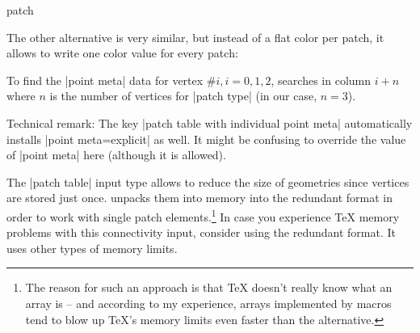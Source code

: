 {\begin{plottype}[/pgfplots]{patch}
\begin{pgfplotskeylist}
        The other alternative  is very similar, but instead of a flat color per patch, it allows
        to write one color value for every patch:
\begin{codeexample}[]
\end{codeexample}
        \noindent To find the |point meta| data for vertex $\#i, i=0,1,2$,
        \PGFPlots{} searches in column $i+n$ where $n$ is the number of
        vertices for |patch type| (in our case, $n=3$).

        Technical remark: The key |patch table with individual point meta|
        automatically installs |point meta=explicit| as well. It might be
        confusing to override the value of |point meta| here (although it is
        allowed).

        The |patch table| input type allows to reduce the size of geometries
        since vertices are stored just once. \PGFPlots{} unpacks them into
        memory into the redundant format in order to work with single patch
        elements.\footnote{The reason for such an approach is that \TeX{}
        doesn't really know what an array is -- and according to my experience,
        arrays implemented by macros tend to blow up \TeX's memory limits even
        faster than the alternative.} In case you experience \TeX{} memory
        problems with this connectivity input, consider using the redundant
        format. It uses other types of memory limits.
    \end{pgfplotskeylist}


\end{plottype}}
